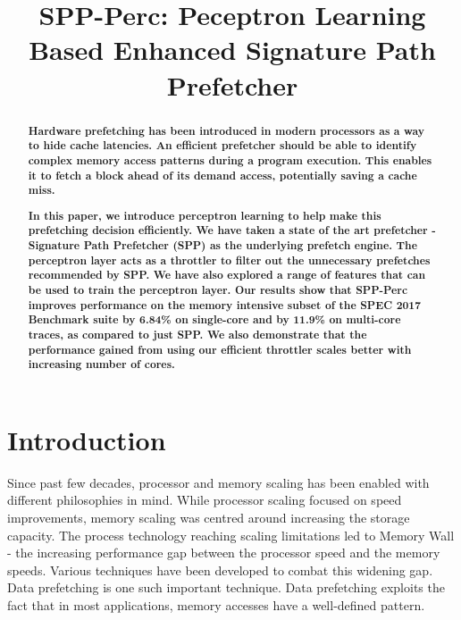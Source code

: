 \documentclass{sig-alternate}
\title{SPP-Perc: Peceptron Learning Based Enhanced Signature Path Prefetcher}
\author{}
\begin{document}
\maketitle
\thispagestyle{firstpage}
\pagestyle{plain}

\begin{abstract}
\textbf{Hardware prefetching has been introduced in modern processors as a way to hide cache latencies. 
An efficient prefetcher should be able to identify complex memory access patterns during a program execution. 
This enables it to fetch a block ahead of its demand access, potentially saving a cache miss.
}

\textbf{In this paper, we introduce perceptron learning to help make this prefetching decision efficiently. 
We have taken a state of the art prefetcher - Signature Path Prefetcher (SPP) as the underlying prefetch engine. 
The perceptron layer acts as a throttler to filter out the unnecessary prefetches recommended by SPP. 
We have also explored a range of features that can be used to train the perceptron layer. 
Our results show that SPP-Perc improves performance on the memory intensive subset of the SPEC 2017 Benchmark suite by 6.84\% on single-core and by 11.9\% on multi-core traces, as compared to just SPP.
We also demonstrate that the performance gained from using our efficient throttler scales better with increasing number of cores.
}
\end{abstract}

\section{Introduction}
Since past few decades, processor and memory scaling has been enabled with different philosophies in mind. 
While processor scaling focused on speed improvements, memory scaling was centred around increasing the storage capacity. 
The process technology reaching scaling limitations led to Memory Wall\cite{MemWall} - the increasing performance gap between the processor speed and the memory speeds. 
Various techniques have been developed to combat this widening gap. 
Data prefetching is one such important technique. 
Data prefetching exploits the fact that in most applications, memory accesses have a well-defined pattern.
\end{document}
